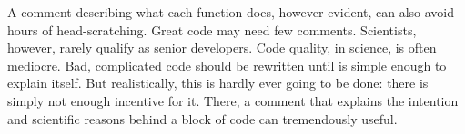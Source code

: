 \documentclass[a4paper,11pt]{article}
\begin{document}
A comment describing what each function does, however evident, can also avoid hours of head-scratching. Great code may need few comments. Scientists, however, rarely qualify as senior developers. Code quality, in science, is often mediocre. Bad, complicated code should be rewritten until is simple enough to explain itself. But realistically, this is hardly ever going to be done: there is simply not enough incentive for it. There, a comment that explains the intention and scientific reasons behind a block of code can tremendously useful.\\

%
\end{document}
